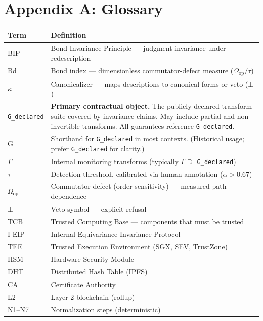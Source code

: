 \documentclass[11pt,letterpaper]{article}
\theoremstyle{definition}
\theoremstyle{remark}
\begin{document}

\appendix

\section*{Appendix A: Glossary}

\begin{longtable}{@{}lp{10cm}@{}}
\toprule
\textbf{Term} & \textbf{Definition} \\
\midrule
\endhead
BIP & Bond Invariance Principle --- judgment invariance under redescription \\
Bd & Bond index --- dimensionless commutator-defect measure ($\Omega_{\mathrm{op}} / \tau$) \\
$\kappa$ & Canonicalizer --- maps descriptions to canonical forms or veto ($\bot$) \\
\texttt{G\_declared} & \textbf{Primary contractual object.} The publicly declared transform suite covered by invariance claims. May include partial and non-invertible transforms. All guarantees reference \texttt{G\_declared}. \\
G & Shorthand for \texttt{G\_declared} in most contexts. (Historical usage; prefer \texttt{G\_declared} for clarity.) \\
$\Gamma$ & Internal monitoring transforms (typically $\Gamma \supseteq$ \texttt{G\_declared}) \\
$\tau$ & Detection threshold, calibrated via human annotation ($\alpha > 0.67$) \\
$\Omega_{\mathrm{op}}$ & Commutator defect (order-sensitivity) --- measured path-dependence \\
$\bot$ & Veto symbol --- explicit refusal \\
TCB & Trusted Computing Base --- components that must be trusted \\
I-EIP & Internal Equivariance Invariance Protocol \\
TEE & Trusted Execution Environment (SGX, SEV, TrustZone) \\
HSM & Hardware Security Module \\
DHT & Distributed Hash Table (IPFS) \\
CA & Certificate Authority \\
L2 & Layer 2 blockchain (rollup) \\
N1--N7 & Normalization steps (deterministic) \\

\end{longtable}
\end{document}
